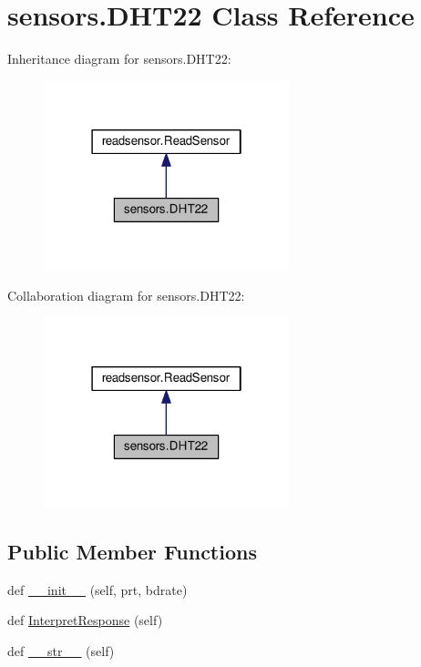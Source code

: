 \hypertarget{classsensors_1_1DHT22}{}\section{sensors.\+D\+H\+T22 Class Reference}
\label{classsensors_1_1DHT22}


Inheritance diagram for sensors.\+D\+H\+T22\+:\nopagebreak
\begin{figure}[H]
\begin{center}
\leavevmode
\includegraphics[width=202pt]{classsensors_1_1DHT22__inherit__graph}
\end{center}
\end{figure}


Collaboration diagram for sensors.\+D\+H\+T22\+:\nopagebreak
\begin{figure}[H]
\begin{center}
\leavevmode
\includegraphics[width=202pt]{classsensors_1_1DHT22__coll__graph}
\end{center}
\end{figure}
\subsection*{Public Member Functions}
\begin{DoxyCompactItemize}
\item 
def \hyperlink{classsensors_1_1DHT22_a5958701fe5dfdaf901c03926ca5ffc33}{\+\_\+\+\_\+init\+\_\+\+\_\+} (self, prt, bdrate)
\item 
def \hyperlink{classsensors_1_1DHT22_a957aa77f0af01e9306aeb86d122969fc}{Interpret\+Response} (self)
\item 
def \hyperlink{classsensors_1_1DHT22_a5c20cdc8c8168efe52e9ce3ce0c3e819}{\+\_\+\+\_\+str\+\_\+\+\_\+} (self)
\end{DoxyCompactItemize}
